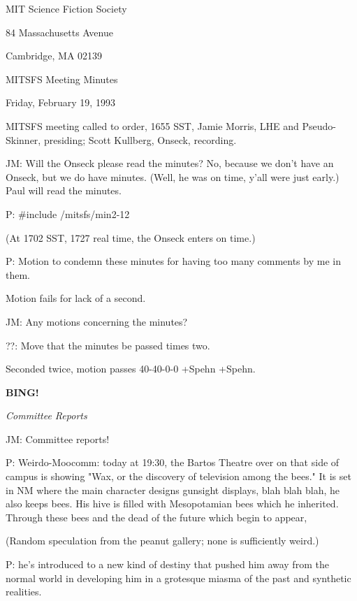 \documentclass[12pt]{article}
\newcommand{\bing}{{\bf BING!} }
\newcommand{\goto}[1]{\bing \vskip 12pt \centerline{{\em{#1}}}}
\begin{document}
\begin{center}

MIT Science Fiction Society 

84 Massachusetts Avenue

Cambridge, MA 02139

\vspace{12pt}

MITSFS Meeting Minutes 

Friday, February 19, 1993

\end{center}
 
\vspace{18pt}

\setlength{\parskip}{6pt}

\noindent
MITSFS meeting called to order, 1655 SST,
Jamie Morris, LHE and Pseudo-Skinner, presiding; Scott Kullberg, Onseck, recording.

JM: Will the Onseck please read the minutes? No, because we don't have an Onseck, but we do have minutes. (Well, he was on time, y'all were just early.) Paul will read the minutes.

P: #include /mitsfs/min2-12

(At 1702 SST, 1727 real time, the Onseck enters on time.)

P: Motion to condemn these minutes for having too many comments by me in them.

Motion fails for lack of a second.

JM: Any motions concerning the minutes?

??: Move that the minutes be passed times two.

Seconded twice, motion passes 40-40-0-0 +Spehn +Spehn.

\goto{Committee Reports}

JM: Committee reports!

P: Weirdo-Moocomm: today at 19:30, the Bartos Theatre over on that side of campus is showing "Wax, or the discovery of television among the bees." It is set in NM where the main character designs gunsight displays, blah blah blah, he also keeps bees. His hive is filled with Mesopotamian bees which he inherited. Through these bees and the dead of the future which begin to appear,

(Random speculation from the peanut gallery; none is sufficiently weird.)

P: he's introduced to a new kind of destiny that pushed him away from the normal world in developing him in a grotesque miasma of the past and synthetic realities.
\end{document}
